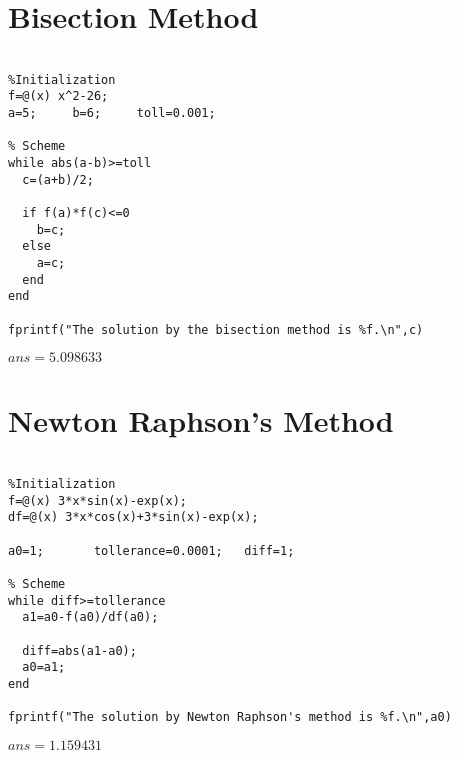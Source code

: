 \section{Bisection Method}

\begin{verbatim}

%Initialization
f=@(x) x^2-26;
a=5;     b=6;     toll=0.001;

% Scheme
while abs(a-b)>=toll
  c=(a+b)/2;

  if f(a)*f(c)<=0
    b=c;
  else
    a=c;
  end
end

fprintf("The solution by the bisection method is %f.\n",c)
\end{verbatim}

\(ans=5.098633\)

\clearpage


\section{Newton Raphson's Method}

\begin{verbatim}

%Initialization
f=@(x) 3*x*sin(x)-exp(x);
df=@(x) 3*x*cos(x)+3*sin(x)-exp(x);

a0=1;       tollerance=0.0001;   diff=1;

% Scheme
while diff>=tollerance
  a1=a0-f(a0)/df(a0);

  diff=abs(a1-a0);
  a0=a1;
end

fprintf("The solution by Newton Raphson's method is %f.\n",a0)
\end{verbatim}

\(ans=1.159431\)
